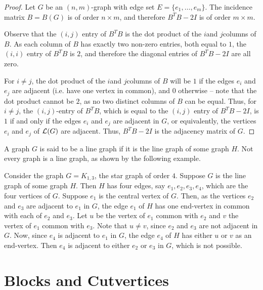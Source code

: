 \begin{proof}
	Let $G$ be an $(n, m)$-graph with edge set $E = \{e_1, \ldots, e_m\}$. The incidence matrix $B = B(G)$ is of order $n \times m$, and therefore $B^T B - 2I$ is of order $m \times m$.
	
	Observe that the $(i, j)$ entry of $B^T B$ is the dot product of the $i$\nth and $j$\nth columns of $B$. As each column of $B$ has exactly two non-zero entries, both equal to $1$, the $(i, i)$ entry of $B^T B$ is $2$, and therefore the diagonal entries of $B^T B - 2I$ are all zero.
	
	For $i \ne j$, the dot product of the $i$\nth and $j$\nth columns of $B$ will be $1$ if the edges $e_i$ and $e_j$ are adjacent (i.e. have one vertex in common), and $0$ otherwise -- note that the dot product cannot be $2$, as no two distinct columns of $B$ can be equal. Thus, for $i \ne j$, the $(i, j)$-entry of $B^T B$, which is equal to the $(i, j)$ entry of $B^T B - 2I$, is $1$ if and only if the edges $e_i$ and $e_j$ are adjacent in $G$, or equivalently, the vertices $e_i$ and $e_j$ of $\operatorname{\mathcal L}(G)$ are adjacent. Thus, $B^T B - 2I$ is the adjacency matrix of $G$.
\end{proof}

A graph $G$ is said to be a line graph if it is the line graph of some graph $H$. Not every graph is a line graph, as shown by the following example.

\begin{Example}
Consider the graph $G = K_{1, 3}$, the star graph of order $4$. Suppose $G$ is the line graph of some graph $H$. Then $H$ has four edges, say $e_1, e_2, e_3, e_4$, which are the four vertices of $G$. Suppose $e_1$ is the central vertex of $G$. Then, as the vertices $e_2$ and $e_3$ are adjacent to $e_1$ in $G$, the edge $e_1$ of $H$ has one end-vertex in common with each of $e_2$ and $e_3$. Let $u$ be the vertex of $e_1$ common with $e_2$ and $v$ the vertex of $e_1$ common with $e_3$. Note that $u \ne v$, since $e_2$ and $e_3$ are not adjacent in $G$. Now, since $e_4$ is adjacent to $e_1$ in $G$, the edge $e_4$ of $H$ has either $u$ or $v$ as an end-vertex. Then $e_4$ is adjacent to either $e_2$ or $e_3$ in $G$, which is not possible.
\end{Example}


\section{Blocks and Cutvertices}\label{sec:Blocks}

